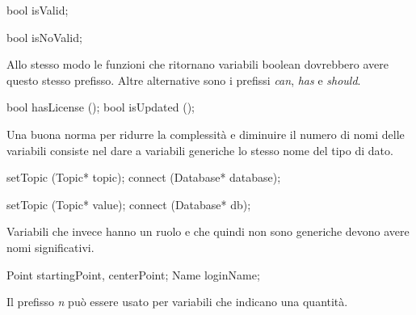 \noindent\begin{minipage}[t]{\cbwidth}
\begin{RightCode}
bool isValid;
\end{RightCode}
\end{minipage}%
\hspace{\cbdistance}
\begin{minipage}[t]{\cbwidth}
\begin{ErrorCode}
bool isNoValid;
\end{ErrorCode}
\end{minipage}

Allo stesso modo le funzioni che ritornano variabili boolean dovrebbero avere questo stesso prefisso.
Altre alternative sono i prefissi \emph{can}, \emph{has} e \emph{should}.

\noindent\begin{minipage}[t]{\rbwidth}
\begin{RightCode}
bool hasLicense ();
bool isUpdated ();
\end{RightCode}
\end{minipage}

Una buona norma per ridurre la complessità e diminuire il numero di nomi delle variabili consiste nel dare a variabili generiche lo stesso nome del tipo di dato.

\noindent\begin{minipage}[t]{\cbwidth}
\begin{RightCode}
setTopic (Topic* topic);
connect (Database* database);
\end{RightCode}
\end{minipage}%
\hspace{\cbdistance}
\begin{minipage}[t]{\cbwidth}
\begin{ErrorCode}
setTopic (Topic* value);
connect (Database* db);
\end{ErrorCode}
\end{minipage}

Variabili che invece hanno un ruolo e che quindi non sono generiche devono avere nomi significativi.

\noindent\begin{minipage}[t]{\rbwidth}
\begin{RightCode}
Point startingPoint, centerPoint;
Name loginName;
\end{RightCode}
\end{minipage}%


Il prefisso \emph{n} può essere usato per variabili che indicano una quantità.

